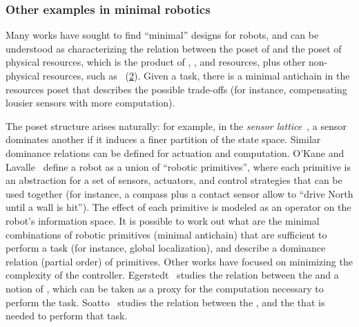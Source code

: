 \begin{figure}[h]
    \centering
    \caption{}
    \label{fig:dp_zia}
\end{figure}

\subsubsection{Other examples in minimal robotics}

Many works have sought to find ``minimal'' designs for robots, and can be understood as characterizing the relation between the poset of  and the poset of physical resources, which is the product of , , and  resources, plus other non-physical resources, such as ~(\cref{fig:robot-generic}).
Given a task, there is a minimal antichain in the resources poset that describes the possible trade-offs (for instance, compensating lousier sensors with more computation).


\begin{figure}
    \centering
    \caption{}
    \label{fig:robot-generic}
\end{figure}


The poset structure arises naturally: for example, in the \emph{sensor lattice}~\cite{lavalle12sensing}, a sensor dominates another if it induces a finer partition of the state space.
Similar dominance relations can be defined for actuation and computation.
O'Kane and Lavalle~\cite{okane08comparing} define a robot as a union of ``robotic primitives'', where each primitive is an abstraction for a set of sensors, actuators, and control strategies that can be used together
(for instance, a compass plus a contact sensor allow to ``drive North until a wall is hit'').
The effect of each primitive is modeled as an operator on the robot's information space.
It is possible to work out what are the minimal combinations of robotic primitives (minimal antichain) that are sufficient to perform a task (for instance, global localization), and describe a dominance relation (partial order) of primitives.
Other works have focused on minimizing the complexity of the controller.
Egerstedt~\cite{egerstedt03motion} studies the relation between the  and a notion of , which can be taken as a proxy for the computation necessary to perform the task.
Soatto~\cite{soatto11steps} studies the relation between the , and the  that is needed to perform that task.

